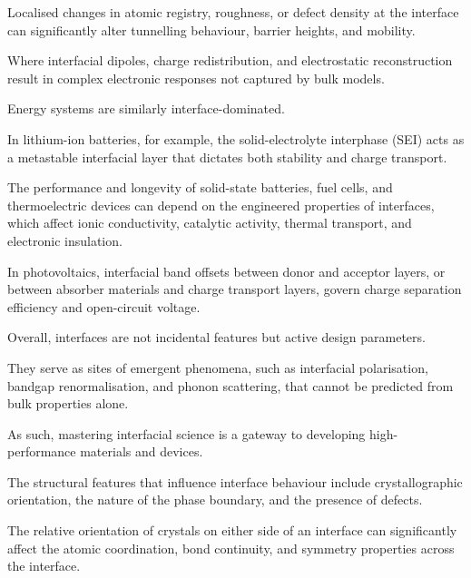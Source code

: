 Localised changes in atomic registry, roughness, or defect density at the interface can significantly alter tunnelling
behaviour, barrier heights, and mobility\cite{Gerber2023-yd, Khot2025-hh}.

Where interfacial dipoles, charge redistribution, and electrostatic reconstruction result in complex electronic
responses not captured by bulk models\cite{Alam2020-ci}.

\label{para:energy_interfaces} %

Energy systems are similarly interface-dominated.

In lithium-ion batteries, for example, the solid-electrolyte interphase (SEI) acts as a metastable interfacial layer
that dictates both stability and charge transport\cite{Butler2019-ws}.

The performance and longevity of solid-state batteries, fuel cells, and thermoelectric devices can depend on the
engineered properties of interfaces, which affect ionic conductivity, catalytic activity, thermal transport, and
electronic insulation\cite{Leitherer2023-ew}.

In photovoltaics, interfacial band offsets between donor and acceptor layers, or between absorber materials and charge
transport layers, govern charge separation efficiency and open-circuit voltage\cite{Low2025-on}.

\label{para:interface_design_parameters} %

Overall, interfaces are not incidental features but active design parameters.

They serve as sites of emergent phenomena, such as interfacial polarisation, bandgap renormalisation, and phonon
scattering, that cannot be predicted from bulk properties alone.

As such, mastering interfacial science is a gateway to developing high-performance materials and devices.

\label{para:interface_definition} %

The structural features that influence interface behaviour include crystallographic orientation, the nature of the phase
boundary, and the presence of defects\cite{Zhang2016-lt}.

\label{para:orientation_effects} %

The relative orientation of crystals on either side of an interface can significantly affect the atomic coordination,
bond continuity, and symmetry properties across the interface\cite{Kuhbach2021-gz, Zhang2016-lt}.

